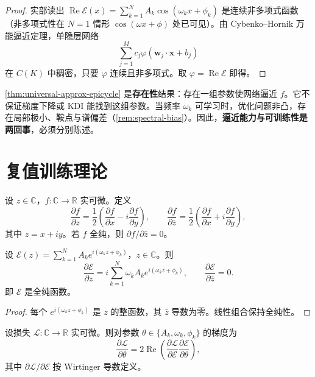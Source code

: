 \begin{proof}
实部读出 $\operatorname{Re}\mathcal E(x)=\sum_{k=1}^{N}A_k\cos(\omega_k x+\phi_k)$ 是连续非多项式函数（非多项式性在 $N=1$ 情形 $\cos(\omega x+\phi)$ 处已可见）。由 Cybenko–Hornik 万能逼近定理，单隐层网络
\[
\sum_{j=1}^{M}c_j\varphi(\mathbf w_j\cdot\mathbf x+b_j)
\]
在 $C(K)$ 中稠密，只要 $\varphi$ 连续且非多项式。取 $\varphi=\operatorname{Re}\mathcal E$ 即得。
\end{proof}

\begin{remark}[逼近与优化的分离]\label{rem:approx-vs-optimisation}
\cref{thm:universal-approx-epicycle} 是\textbf{存在性}结果：存在一组参数使网络逼近 $f$。它不保证梯度下降或 KDI 能找到这组参数。当频率 $\omega_k$ 可学习时，优化问题非凸，存在局部极小、鞍点与谱偏差（\cref{rem:spectral-bias}）。因此，\textbf{逼近能力与可训练性是两回事}，必须分别陈述。
\end{remark}

\section{复值训练理论}

\begin{definition}[Wirtinger 导数]\label{def:wirtinger}
设 $z\in\mathbb C$，$f:\mathbb C\to\mathbb R$ 实可微。定义
\[
\frac{\partial f}{\partial z}=\frac{1}{2}\left(\frac{\partial f}{\partial x}-i\frac{\partial f}{\partial y}\right),\qquad
\frac{\partial f}{\partial\bar z}=\frac{1}{2}\left(\frac{\partial f}{\partial x}+i\frac{\partial f}{\partial y}\right),
\]
其中 $z=x+iy$。若 $f$ 全纯，则 $\partial f/\partial\bar z=0$。
\end{definition}

\begin{theorem}\label{thm:wirtinger-epicycle}
设 $\mathcal E(z)=\sum_{k=1}^{N}A_k e^{i(\omega_k z+\phi_k)}$，$z\in\mathbb C$。则
\[
\frac{\partial\mathcal E}{\partial z}=i\sum_{k=1}^{N}\omega_k A_k e^{i(\omega_k z+\phi_k)},\qquad
\frac{\partial\mathcal E}{\partial\bar z}=0.
\]
即 $\mathcal E$ 是全纯函数。
\end{theorem}

\begin{proof}
每个 $e^{i(\omega_k z+\phi_k)}$ 是 $z$ 的整函数，其 $\bar z$ 导数为零。线性组合保持全纯性。
\end{proof}

\begin{corollary}[实值损失下的反向传播]\label{cor:backprop-real-loss}
设损失 $\mathcal L:\mathbb C\to\mathbb R$ 实可微。则对参数 $\theta\in\{A_k,\omega_k,\phi_k\}$ 的梯度为
\[
\frac{\partial\mathcal L}{\partial\theta}=2\operatorname{Re}\left(\frac{\partial\mathcal L}{\partial\mathcal E}\frac{\partial\mathcal E}{\partial\theta}\right),
\]
其中 $\partial\mathcal L/\partial\mathcal E$ 按 Wirtinger 导数定义。
\end{corollary}

